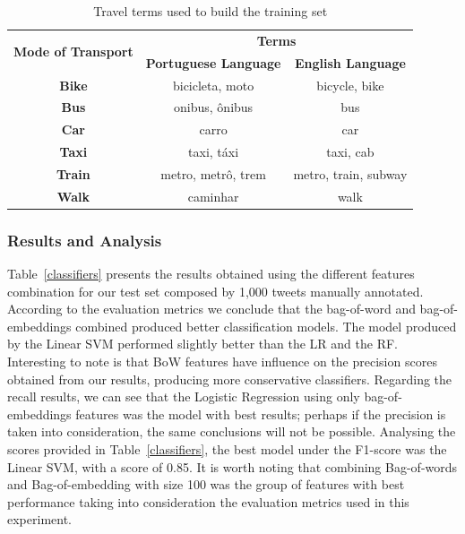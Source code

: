 \begin{table}[htbp]
	\centering
	\small
	\caption{Travel terms used to build the training set}
	\label{tab:terms}
	\begin{tabular}{c|c|c}
		\hline
		\multirow{2}{*}{\textbf{Mode of Transport}} & \multicolumn{2}{c}{\textbf{Terms}} \\ \cline{2-3} 
		& \multicolumn{1}{l|}{\textbf{Portuguese Language}} & \textbf{English Language} \\ \hline
		\textbf{Bike} & bicicleta, moto & bicycle, bike \\
		\textbf{Bus} & onibus, ônibus & bus \\
		\textbf{Car} & carro & car \\
		\textbf{Taxi} & taxi, táxi & taxi, cab \\
		\textbf{Train} & metro, metrô, trem & metro, train, subway \\
		\textbf{Walk} & caminhar & walk \\ \hline
	\end{tabular}
\end{table}

\subsubsection{Results and Analysis}
\label{subsubsec:results_rio_de_janeiro_sao_paulo}
Table~\ref{classifiers} presents the results obtained using the different features combination for our test set composed by 1,000 tweets manually annotated. According to the evaluation metrics we conclude that the bag-of-word and bag-of-embeddings combined produced better classification models. The model produced by the Linear SVM performed slightly better than the LR and the RF. Interesting to note is that \gls{BoW} features have influence on the precision scores obtained from our results, producing more conservative classifiers. Regarding the recall results, we can see that the Logistic Regression using only bag-of-embeddings features was the model with best results; perhaps if the precision is taken into consideration, the same conclusions will not be possible. Analysing the scores provided in Table~\ref{classifiers}, the best model under the F1-score was the Linear SVM, with a score of 0.85. It is worth noting that combining Bag-of-words and Bag-of-embedding with size 100 was the group of features with best performance taking into consideration the evaluation metrics used in this experiment.

